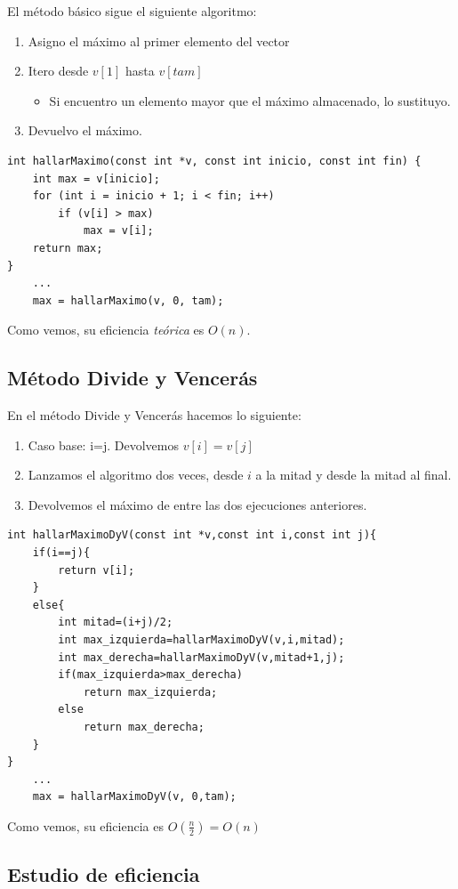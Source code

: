 \documentclass[12pt,spanish]{article}
\begin{document}
El método básico sigue el siguiente algoritmo:
\begin{enumerate}
\item Asigno el máximo al primer elemento del vector
\item Itero desde $v[1]$ hasta $v[tam]$
	\begin{itemize}
		\item Si encuentro un elemento mayor que el máximo almacenado, lo 			sustituyo.
	\end{itemize}
	\item Devuelvo el máximo.
\end{enumerate}
\begin{verbatim}
int hallarMaximo(const int *v, const int inicio, const int fin) {
	int max = v[inicio];
	for (int i = inicio + 1; i < fin; i++)
		if (v[i] > max)
			max = v[i];
	return max;
}
	...
	max = hallarMaximo(v, 0, tam);
\end{verbatim}

Como vemos, su eficiencia \emph{teórica} es $O(n)$.

\subsection{Método Divide y Vencerás}

En el método Divide y Vencerás hacemos lo siguiente:
\begin{enumerate}
\item Caso base: i=j. Devolvemos $v[i]=v[j]$
\item Lanzamos el algoritmo dos veces, desde $i$ a la mitad y desde la mitad al final.
\item Devolvemos el máximo de entre las dos ejecuciones anteriores.
\end{enumerate}

\begin{verbatim}
int hallarMaximoDyV(const int *v,const int i,const int j){
	if(i==j){
		return v[i];
	}
	else{
		int mitad=(i+j)/2;
		int max_izquierda=hallarMaximoDyV(v,i,mitad);
		int max_derecha=hallarMaximoDyV(v,mitad+1,j);
		if(max_izquierda>max_derecha)
			return max_izquierda;
		else
			return max_derecha;
	}
}
	...
	max = hallarMaximoDyV(v, 0,tam);
\end{verbatim}
Como vemos, su eficiencia es $O(\frac{n}{2})=O(n)$
\subsection{Estudio de eficiencia}
\end{document}

